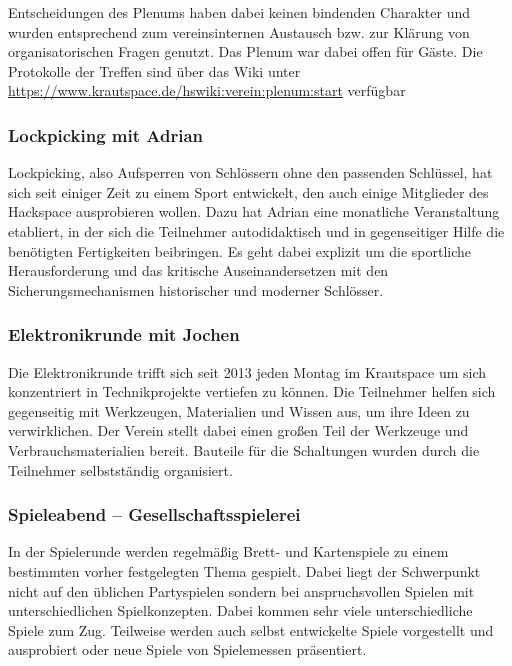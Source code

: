 \documentclass[10pt,DIV16]{scrartcl}
\begin{document}
Entscheidungen des Plenums haben dabei keinen bindenden Charakter und
wurden entsprechend zum vereinsinternen Austausch bzw. zur Klärung von
organisatorischen Fragen genutzt. Das Plenum war dabei offen für Gäste.
Die Protokolle der Treffen sind über das Wiki unter
\url{https://www.krautspace.de/hswiki:verein:plenum:start} verfügbar


\subsubsection{Lockpicking mit Adrian}

Lockpicking, also Aufsperren von Schlössern ohne den passenden
Schlüssel, hat sich seit einiger Zeit zu einem Sport entwickelt, den
auch einige Mitglieder des Hackspace ausprobieren wollen. Dazu hat
Adrian eine monatliche Veranstaltung etabliert, in der sich die Teilnehmer
autodidaktisch und in gegenseitiger Hilfe die benötigten Fertigkeiten
beibringen. Es geht dabei explizit um die sportliche Herausforderung
und das kritische Auseinandersetzen mit den Sicherungsmechanismen
historischer und moderner Schlösser.

\subsubsection{Elektronikrunde mit Jochen}

Die Elektronikrunde trifft sich seit 2013 jeden Montag im Krautspace um
sich konzentriert in Technikprojekte vertiefen zu können. Die
Teilnehmer helfen sich gegenseitig mit Werkzeugen, Materialien und
Wissen aus, um ihre Ideen zu verwirklichen. Der Verein stellt dabei
einen großen Teil der Werkzeuge und Verbrauchsmaterialien bereit.
Bauteile für die Schaltungen wurden durch die Teilnehmer selbstständig
organisiert.

\subsubsection{Spieleabend -- Gesellschaftsspielerei}

In der Spielerunde werden regelmäßig Brett- und Kartenspiele zu einem
bestimmten vorher festgelegten Thema gespielt. Dabei liegt der Schwerpunkt
nicht auf den üblichen Partyspielen sondern bei anspruchsvollen Spielen mit
unterschiedlichen Spielkonzepten. Dabei kommen sehr viele unterschiedliche
Spiele zum Zug. Teilweise werden auch selbst entwickelte Spiele vorgestellt
und ausprobiert oder neue Spiele von Spielemessen präsentiert.
\end{document}
